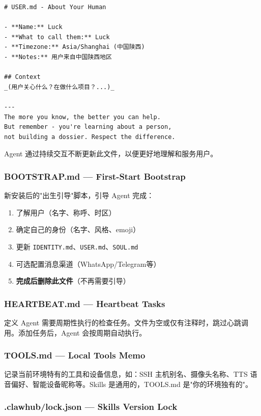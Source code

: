 \begin{lstlisting}
# USER.md - About Your Human

- **Name:** Luck
- **What to call them:** Luck
- **Timezone:** Asia/Shanghai (中国陕西)
- **Notes:** 用户来自中国陕西地区

## Context
_(用户关心什么？在做什么项目？...)_

---
The more you know, the better you can help.
But remember - you're learning about a person,
not building a dossier. Respect the difference.
\end{lstlisting}

Agent 通过持续交互不断更新此文件，以便更好地理解和服务用户。

\subsubsection{BOOTSTRAP.md --- First-Start Bootstrap}


新安装后的"出生引导"脚本，引导 Agent 完成：

\begin{enumerate}
  \item 了解用户（名字、称呼、时区）
  \item 确定自己的身份（名字、风格、emoji）
  \item 更新 \texttt{IDENTITY.md}、\texttt{USER.md}、\texttt{SOUL.md}
  \item 可选配置消息渠道（WhatsApp/Telegram等）
  \item \textbf{完成后删除此文件}（不再需要引导）
\end{enumerate}

\subsubsection{HEARTBEAT.md --- Heartbeat Tasks}


定义 Agent 需要周期性执行的检查任务。文件为空或仅有注释时，跳过心跳调用。添加任务后，Agent 会按周期自动执行。

\subsubsection{TOOLS.md --- Local Tools Memo}


记录当前环境特有的工具和设备信息，如：SSH 主机别名、摄像头名称、TTS 语音偏好、智能设备昵称等。Skills 是通用的，TOOLS.md 是"你的环境独有的"。

\subsubsection{.clawhub/lock.json --- Skills Version Lock}



